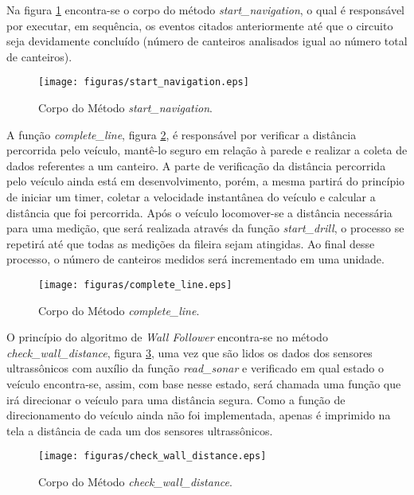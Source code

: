   Na figura \ref{fig:start_navigation} encontra-se o corpo do método \textit{start\_navigation}, o qual
  é responsável por executar, em sequência, os eventos citados anteriormente até que o circuito
  seja devidamente concluído (número de canteiros analisados igual ao número total de canteiros).

  \begin{figure}[!htbp]
  \begin{center}
  \texttt{[image: figuras/start\_navigation.eps]}
  \caption{\label{fig:start_navigation}Corpo do Método \textit{start\_navigation}.}
  \end{center}
  \end{figure}

  A função \textit{complete\_line}, figura \ref{fig:complete_line}, é responsável por verificar a distância percorrida pelo veículo, mantê-lo
  seguro em relação à parede e realizar a coleta de dados referentes a um canteiro. A parte de verificação
  da distância percorrida pelo veículo ainda está em desenvolvimento, porém, a mesma partirá do princípio
  de iniciar um timer, coletar a velocidade instantânea do veículo e calcular a distância que foi percorrida.
  Após o veículo locomover-se a distância necessária para uma medição, que
  será realizada através da função \textit{start\_drill}, o processo se repetirá até que todas as medições da fileira sejam atingidas. Ao final desse processo, o número de canteiros medidos será incrementado em uma unidade.

  \begin{figure}[!htbp]
  \begin{center}
  \texttt{[image: figuras/complete\_line.eps]}
  \caption{\label{fig:complete_line}Corpo do Método \textit{complete\_line}.}
  \end{center}
  \end{figure}

  O princípio do algoritmo de \textit{Wall Follower} encontra-se no método \textit{check\_wall\_distance}, figura \ref{fig:check_wall_distance}, uma vez que são lidos os dados dos sensores ultrassônicos com auxílio
  da função \textit{read\_sonar} e verificado em qual estado o veículo encontra-se, assim, com base nesse estado, será chamada uma função que irá direcionar o veículo para uma distância segura. Como a função de direcionamento do veículo ainda não foi implementada, apenas é imprimido na tela a distância de cada um dos sensores ultrassônicos.

  \begin{figure}[!htbp]
  \begin{center}
  \texttt{[image: figuras/check\_wall\_distance.eps]}
  \caption{\label{fig:check_wall_distance}Corpo do Método \textit{check\_wall\_distance}.}
  \end{center}
  \end{figure}

